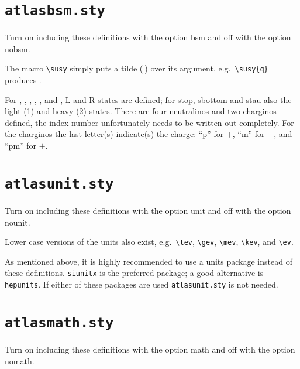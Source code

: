 \documentclass[UKenglish]{style/atlasdoc}
\newcommand{\File}[1]{\texttt{#1}\xspace}
\newcommand{\Macro}[1]{\texttt{\textbackslash #1}\xspace}
\newcommand{\Option}[1]{\textsf{#1}\xspace}
\newcommand{\Package}[1]{\texttt{#1}\xspace}
\begin{document}
{%
\section{\File{atlasbsm.sty}}

Turn on including these definitions with the option \Option{bsm} and off with the option \Option{nobsm}.

The macro \Macro{susy} simply puts a tilde ($\tilde{\ }$) over its argument,
e.g.\ \verb|\susy{q}| produces .

For , , , \slepton, \sel, \smu and
\stau, L and R states are defined; for stop, sbottom and stau also the
light (1) and heavy (2) states.
There are four neutralinos and two charginos defined, 
the index number unfortunately needs to be written out completely. 
For the charginos the last letter(s) indicate(s) the charge: 
\enquote{p} for $+$, \enquote{m} for $-$, and \enquote{pm} for $\pm$.




\section{\File{atlasunit.sty}}

Turn on including these definitions with the option \Option{unit} and off with the option \Option{nounit}.



\noindent Lower case versions of the units also exist, e.g.\ \verb|\tev|, \verb|\gev|, \verb|\mev|, \verb|\kev|, and
\verb|\ev|. 

As mentioned above, it is highly recommended to use a units package instead of
these definitions. \Package{siunitx} is the preferred package; a good alternative is \Package{hepunits}.
If either of these packages are used \File{atlasunit.sty} is not needed.


\section{\File{atlasmath.sty}}

Turn on including these definitions with the option \Option{math} and off with the option \Option{nomath}.



}
\end{document}
